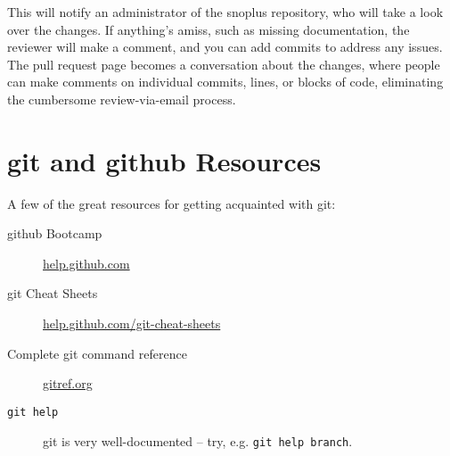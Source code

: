 \documentclass{article}
\begin{document}
This will notify an administrator of the snoplus repository, who will take a look over the changes. If anything's amiss, such as missing documentation, the reviewer will make a comment, and you can add commits to address any issues. The pull request page becomes a conversation about the changes, where people can make comments on individual commits, lines, or blocks of code, eliminating the cumbersome review-via-email process.

\section{git and github Resources}
A few of the great resources for getting acquainted with git:
\begin{description}
\item[github Bootcamp] \href{http://help.github.com}{help.github.com}
\item[git Cheat Sheets] \href{http://help.github.com/git-cheat-sheets}{help.github.com/git-cheat-sheets}
\item[Complete git command reference] \href{http://gitref.org}{gitref.org}
\item[{\tt git help}] git is very well-documented -- try, e.g. {\tt git help branch}.
\end{description}


\end{document}

